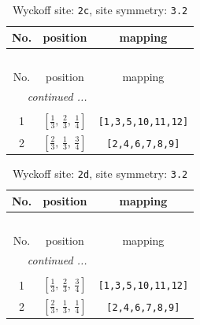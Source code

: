 \documentclass[fleqn,8pt]{jsarticle}
\begin{document}
\begin{longtable}{ccc}
\caption{Wyckoff site: {\tt 2c}, site symmetry: {\tt 3.2}}
 \\
 \hline \hline
No. & position & mapping \\ \hline \endfirsthead

\multicolumn{2}{l}{\tablename\ \thetable{}} \\
 \hline \hline
No. & position & mapping \\ \hline \endhead

 \hline \hline
\multicolumn{2}{r}{\footnotesize\it continued ...} \\ \endfoot

 \hline \hline
\multicolumn{2}{r}{} \\ \endlastfoot

1 & $\left[ \frac{1}{3},\, \frac{2}{3},\, \frac{1}{4} \right]$ & {\tt [1,3,5,10,11,12]} \\ \hline
2 & $\left[ \frac{2}{3},\, \frac{1}{3},\, \frac{3}{4} \right]$ & {\tt [2,4,6,7,8,9]} \\
\end{longtable}
\renewcommand{\arraystretch}{1.2}
\begin{longtable}{ccc}
\caption{Wyckoff site: {\tt 2d}, site symmetry: {\tt 3.2}}
 \\
 \hline \hline
No. & position & mapping \\ \hline \endfirsthead

\multicolumn{2}{l}{\tablename\ \thetable{}} \\
 \hline \hline
No. & position & mapping \\ \hline \endhead

 \hline \hline
\multicolumn{2}{r}{\footnotesize\it continued ...} \\ \endfoot

 \hline \hline
\multicolumn{2}{r}{} \\ \endlastfoot

1 & $\left[ \frac{1}{3},\, \frac{2}{3},\, \frac{3}{4} \right]$ & {\tt [1,3,5,10,11,12]} \\ \hline
2 & $\left[ \frac{2}{3},\, \frac{1}{3},\, \frac{1}{4} \right]$ & {\tt [2,4,6,7,8,9]} \\
\end{longtable}
\renewcommand{\arraystretch}{1.2}
\end{document}
